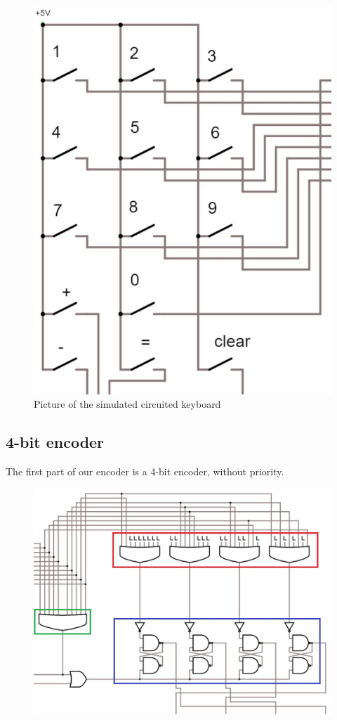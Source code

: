 \documentclass{article}
\begin{document}
\begin{figure}[h]
    \centering
    \includegraphics[scale=.3]{IM_Keyboard}
    \caption{Picture of the simulated circuited keyboard}
    \label{Keybaord}
\end{figure}

\clearpage

\subsection{4-bit encoder}
The first part of our encoder is a 4-bit encoder, without priority. 

\begin{figure}[h]
    \centering
    \includegraphics[scale=.35]{IM_4BitEncoder.JPG}
    \caption{}
    \label{encoder}
\end{figure}
\end{document}
